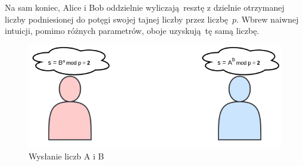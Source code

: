 \documentclass[12pt]{article}
\begin{document}
Na sam koniec, Alice i Bob oddzielnie wyliczają resztę z dzielnie otrzymanej liczby podniesionej do potęgi swojej tajnej liczby przez liczbę $p$.
Wbrew naiwnej intuicji, pomimo różnych parametrów, oboje uzyskują tę samą liczbę.

\begin{figure}[h!]
	\begin{center}
		\includegraphics[scale=0.3]{4-dh-diagram-3}
	\end{center}
	\caption{Wysłanie liczb A i B}
\end{figure}
\end{document}
